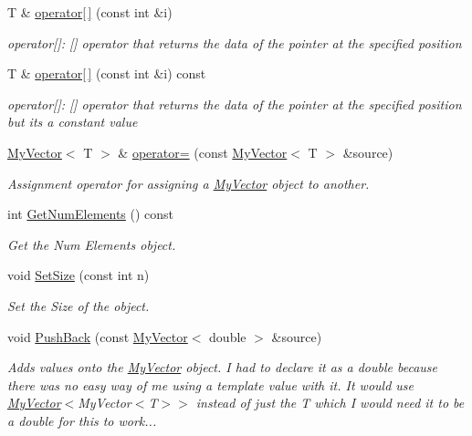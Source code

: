 \begin{DoxyCompactItemize}
T \& \mbox{\hyperlink{class_my_vector_a52eca35ed558d978bf5a8541f9d0115c}{operator\mbox{[}$\,$\mbox{]}}} (const int \&i)
\begin{DoxyCompactList}\small\item\em operator\mbox{[}\mbox{]}\+: \mbox{[}\mbox{]} operator that returns the data of the pointer at the specified position \end{DoxyCompactList}\item 
T \& \mbox{\hyperlink{class_my_vector_a01d48c27ba17ad15aa29b2f039c303cd}{operator\mbox{[}$\,$\mbox{]}}} (const int \&i) const
\begin{DoxyCompactList}\small\item\em operator\mbox{[}\mbox{]}\+: \mbox{[}\mbox{]} operator that returns the data of the pointer at the specified position but it\textquotesingle{}s a constant value \end{DoxyCompactList}\item 
\mbox{\hyperlink{class_my_vector}{My\+Vector}}$<$ T $>$ \& \mbox{\hyperlink{class_my_vector_a459ecae4c3fc3836415467db79bd0af2}{operator=}} (const \mbox{\hyperlink{class_my_vector}{My\+Vector}}$<$ T $>$ \&source)
\begin{DoxyCompactList}\small\item\em Assignment operator for assigning a \mbox{\hyperlink{class_my_vector}{My\+Vector}} object to another. \end{DoxyCompactList}\item 
int \mbox{\hyperlink{class_my_vector_a5806423f48877c084cc436ecdffa756c}{Get\+Num\+Elements}} () const
\begin{DoxyCompactList}\small\item\em Get the Num Elements object. \end{DoxyCompactList}\item 
void \mbox{\hyperlink{class_my_vector_a54da580455b3348ddc47a6359e9db444}{Set\+Size}} (const int n)
\begin{DoxyCompactList}\small\item\em Set the Size of the object. \end{DoxyCompactList}\item 
void \mbox{\hyperlink{class_my_vector_a1070a35184f1a8223a7df7f4fdd78492}{Push\+Back}} (const \mbox{\hyperlink{class_my_vector}{My\+Vector}}$<$ double $>$ \&source)
\begin{DoxyCompactList}\small\item\em Adds values onto the \mbox{\hyperlink{class_my_vector}{My\+Vector}} object. I had to declare it as a double because there was no easy way of me using a template value with it. It would use \mbox{\hyperlink{class_my_vector}{My\+Vector}}$<$My\+Vector$<$\+T$>$$>$ instead of just the T which I would need it to be a double for this to work... \end{DoxyCompactList}\item 

\end{DoxyCompactItemize}
